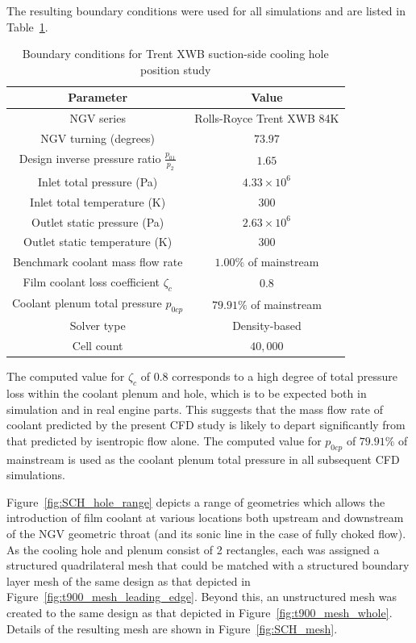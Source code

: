 \documentclass[a4paper, 11pt, oneside]{report}
\begin{document}
The resulting boundary conditions were used for all simulations and are listed in Table~\ref{SCH_parameters}.

\begin{table}[H]
\caption{Boundary conditions for Trent XWB suction-side cooling hole position study}
\label{SCH_parameters}
\begin{center}
\begin{tabular}{|c|c|}
\hline
Parameter & Value\\
\hline
NGV series & Rolls-Royce Trent XWB 84K\\
NGV turning (degrees) & $73.97$\\
Design inverse pressure ratio $\frac{p_{01}}{p_2}$ & $1.65$\\
Inlet total pressure (Pa) & $4.33 \times 10^6$\\
Inlet total temperature (K) & $300$\\
Outlet static pressure (Pa) & $2.63 \times 10^6$\\
Outlet static temperature (K) & $300$\\
Benchmark coolant mass flow rate & $1.00\%$ of mainstream\\
Film coolant loss coefficient $\zeta_c$ & $0.8$\\
Coolant plenum total pressure $p_{0cp}$ & $79.91\%$ of mainstream\\
Solver type & Density-based\\
Cell count & $40,000$\\
\hline
\end{tabular}
\end{center}
\end{table}

The computed value for $\zeta_c$ of $0.8$ corresponds to a high degree of total pressure loss within the coolant plenum and hole, which is to be expected both in simulation and in real engine parts. This suggests that the mass flow rate of coolant predicted by the present CFD study is likely to depart significantly from that predicted by isentropic flow alone. The computed value for $p_{0cp}$ of $79.91\%$ of mainstream is used as the coolant plenum total pressure in all subsequent CFD simulations.

Figure~\ref{fig:SCH_hole_range} depicts a range of geometries which allows the introduction of film coolant at various locations both upstream and downstream of the NGV geometric throat (and its sonic line in the case of fully choked flow). As the cooling hole and plenum consist of 2 rectangles, each was assigned a structured quadrilateral mesh that could be matched with a structured boundary layer mesh of the same design as that depicted in Figure~\ref{fig:t900_mesh_leading_edge}. Beyond this, an unstructured mesh was created to the same design as that depicted in Figure~\ref{fig:t900_mesh_whole}. Details of the resulting mesh are shown in Figure~\ref{fig:SCH_mesh}.
\end{document}
